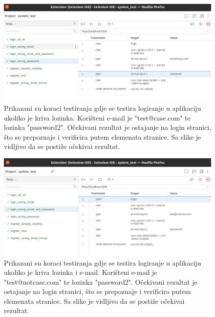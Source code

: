             \begin{figure}[H]
                \includegraphics[width=\textwidth]{slike/tests_system/login_wrong_password.png} %
                \caption{Prikazani su koraci testiranja gdje se testira logiranje u aplikaciju ukoliko je kriva lozinka. Korišteni e-mail je "test@case.com" te lozinka "password2". Očekivani rezultat je ostajanje na login stranici, što se prepoznaje i verificira putem elemenata stranice. Sa slike je vidljivo da se postiže očekivai rezultat.}
                \label{fig:struktura} %
            \end{figure}

            \begin{figure}[H]
                \includegraphics[width=\textwidth]{slike/tests_system/login_wrong_email_and_password.png} %
                \caption{Prikazani su koraci testiranja gdje se testira logiranje u aplikaciju ukoliko je kriva lozinka i e-mail. Korišteni e-mail je "test@notcase.com" te lozinka "password2". Očekivani rezultat je ostajanje na login stranici, što se prepoznaje i verificira putem elemenata stranice. Sa slike je vidljivo da se postiže očekivai rezultat.}
                \label{fig:struktura} %
            \end{figure}

